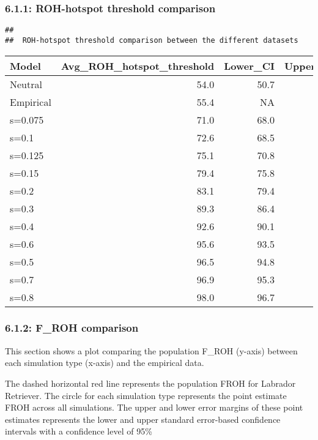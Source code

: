 \documentclass[
]{article}
\begin{document}
\subsubsection{6.1.1: ROH-hotspot threshold
comparison}\label{roh-hotspot-threshold-comparison}

\begin{verbatim}
## 
##  ROH-hotspot threshold comparison between the different datasets
\end{verbatim}

\begin{longtable}[]{@{}lrrr@{}}
\toprule\noalign{}
Model & Avg\_ROH\_hotspot\_threshold & Lower\_CI & Upper\_CI \\
\midrule\noalign{}
\endhead
\bottomrule\noalign{}
\endlastfoot
Neutral & 54.0 & 50.7 & 57.4 \\
Empirical & 55.4 & NA & NA \\
s=0.075 & 71.0 & 68.0 & 74.1 \\
s=0.1 & 72.6 & 68.5 & 76.7 \\
s=0.125 & 75.1 & 70.8 & 79.3 \\
s=0.15 & 79.4 & 75.8 & 83.0 \\
s=0.2 & 83.1 & 79.4 & 86.8 \\
s=0.3 & 89.3 & 86.4 & 92.2 \\
s=0.4 & 92.6 & 90.1 & 95.1 \\
s=0.6 & 95.6 & 93.5 & 97.7 \\
s=0.5 & 96.5 & 94.8 & 98.2 \\
s=0.7 & 96.9 & 95.3 & 98.5 \\
s=0.8 & 98.0 & 96.7 & 99.3 \\
\end{longtable}

\subsubsection{6.1.2: F\_ROH comparison}\label{f_roh-comparison}

This section shows a plot comparing the population F\_ROH (y-axis)
between each simulation type (x-axis) and the empirical data.

The dashed horizontal red line represents the population FROH for
Labrador Retriever. The circle for each simulation type represents the
point estimate FROH across all simulations. The upper and lower error
margins of these point estimates represents the lower and upper standard
error-based confidence intervals with a confidence level of 95\%
\end{document}
